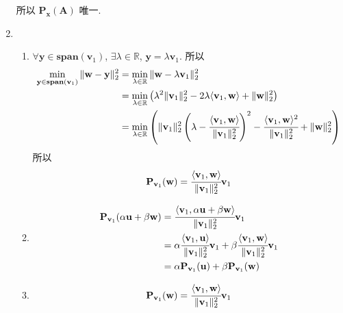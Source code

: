 \documentclass[11pt,letter,notitlepage]{article}
\newcommand{\proj}[2]{\textbf{P}_{#2} (#1)}
\newcommand{\lspan}[1]{\textbf{span}  (#1)  }
\begin{document}
\begin{solution}
\begin{enumerate}
              所以 $\proj{\mathbf{A}}{\mathbf{x}}$ 唯一.
        \item \begin{enumerate}
                  \item $\forall \mathbf{y}\in\lspan{\mathbf{v}_1}$, $\exists \lambda\in\mathbb{R}$, $\mathbf{y}=\lambda\mathbf{v}_1$. 所以
                        $$\begin{aligned}
                                \min_{\mathbf{y}\in\lspan{\mathbf{v}_1}}\|\mathbf{w}-\mathbf{y}\|_2^2
                                 & =\min_{\lambda\in\mathbb{R}}\|\mathbf{w}-\lambda\mathbf{v}_1\|_2^2                                                                             \\
                                 & =\min_{\lambda\in\mathbb{R}} \left( \lambda^2\|\mathbf{v}_1\|_2^2 -2\lambda \langle \mathbf{v}_1,\mathbf{w} \rangle+\|\mathbf{w}\|_2^2 \right) \\
                                 & =\min_{\lambda\in\mathbb{R}} \left(
                                \|\mathbf{v}_1\|_2^2\left( \lambda-\cfrac{\langle \mathbf{v}_1,\mathbf{w} \rangle}{\|\mathbf{v}_1\|_2^2} \right)^2- \cfrac{\langle \mathbf{v}_1,\mathbf{w} \rangle^2}{\|\mathbf{v}_1\|_2^2}+\|\mathbf{w}\|_2^2
                                \right)
                            \end{aligned}$$
                        所以 $$\proj{\mathbf{w}}{\mathbf{v}_1}=\cfrac{\langle \mathbf{v}_1,\mathbf{w} \rangle}{\|\mathbf{v}_1\|_2^2}\mathbf{v}_1$$
                  \item $$\begin{aligned}
                                \proj{\alpha\mathbf{u}+\beta\mathbf{w}}{\mathbf{v}_1}
                                 & =\cfrac{\langle \mathbf{v}_1,\alpha\mathbf{u}+\beta\mathbf{w} \rangle}{\|\mathbf{v}_1\|_2^2}\mathbf{v}_1                                                                             \\
                                 & = \alpha \cfrac{\langle \mathbf{v}_1,\mathbf{u} \rangle}{\|\mathbf{v}_1\|_2^2}\mathbf{v}_1 + \beta \cfrac{\langle \mathbf{v}_1,\mathbf{w} \rangle}{\|\mathbf{v}_1\|_2^2}\mathbf{v}_1 \\
                                 & = \alpha \proj{\mathbf{u}}{\mathbf{v}_1} + \beta \proj{\mathbf{w}}{\mathbf{v}_1}
                            \end{aligned}$$
                  \item $$\proj{\mathbf{w}}{\mathbf{v}_1}
                            =\cfrac{\langle \mathbf{v}_1,\mathbf{w} \rangle}{\|\mathbf{v}_1\|_2^2}\mathbf{v}_1
$$
\end{enumerate}
\end{enumerate}
\end{solution}
\end{document}
